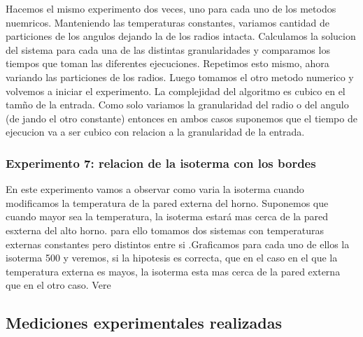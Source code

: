     Hacemos el mismo experimento dos veces, uno para cada uno de los metodos nuemricos. Manteniendo las temperaturas constantes, variamos cantidad de particiones de los angulos dejando la de los radios intacta. Calculamos la solucion del sistema para cada una de las distintas granularidades y comparamos los tiempos que toman las diferentes ejecuciones. Repetimos esto mismo, ahora variando las particiones de los radios. Luego tomamos el otro metodo numerico y volvemos a iniciar el experimento. 
  	La complejidad del algoritmo es cubico en el tamño de la entrada. Como solo variamos la granularidad del radio o del angulo (de jando el otro constante) entonces en ambos casos suponemos que el tiempo de ejecucion va a ser cubico con relacion a la granularidad de la entrada.

  \subsubsection*{Experimento 7: relacion de la isoterma con los bordes}
    En este experimento vamos a observar como varia la isoterma cuando modificamos la temperatura de la pared externa del horno.
    Suponemos que cuando mayor sea la temperatura, la isoterma estará mas cerca de la pared esxterna del alto horno. 
    para ello tomamos dos sistemas con temperaturas externas constantes pero distintos entre si .Graficamos para cada uno de ellos la isoterma 500 y veremos, si la hipotesis es correcta, que en el caso en el que la temperatura externa es mayos, la isoterma esta mas cerca de la pared externa que en el otro caso. 
    Vere

  \subsection{Mediciones experimentales realizadas}
